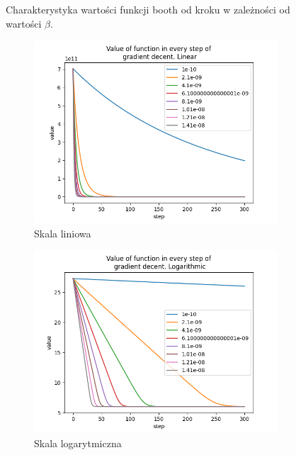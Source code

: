 \begin{figure}[h!]
	\caption{Charakterystyka wartości funkcji booth od kroku w zależności od wartości $\beta$.}
	\begin{subfigure}[b]{0.3\linewidth}
		\includegraphics[width=\linewidth]{photos/f1_vals_lin.png}
		\caption{Skala liniowa}
	\end{subfigure}
	\begin{subfigure}[b]{0.3\linewidth}
		\includegraphics[width=\linewidth]{photos/f1_vals_log.png}
		\caption{Skala logarytmiczna}
	\end{subfigure}
	\caption{Charakterystyka wartości funkcji CEC2017 f1 od kroku w zależności od wartości $\beta$.}
	\begin{subfigure}[b]{0.3\linewidth}

\end{subfigure}
\end{figure}

